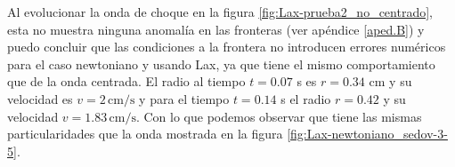 \documentclass[12pt,a4paper]{book}
\begin{document}
Al evolucionar la onda de choque en la figura \ref{fig:Lax-prueba2_no_centrado},  esta no muestra ninguna anomalía en las fronteras (ver apéndice \ref{aped.B}) y puedo concluir que las condiciones a la frontera no introducen errores numéricos para el caso newtoniano y usando Lax, ya que tiene el mismo comportamiento que de la onda centrada. El radio al tiempo $t = 0.07$ s es $r = 0.34$ cm y su velocidad es $v = 2 \, \mathrm{cm}/\mathrm{s}$ y para el tiempo $t = 0.14$ s el radio $r = 0.42$ y su velocidad $v = 1.83 \, \mathrm{cm}/\mathrm{s}$. Con lo que podemos observar que tiene las mismas particularidades que la onda mostrada en la figura \ref{fig:Lax-newtoniano_sedov-3-5}.


\end{document}

